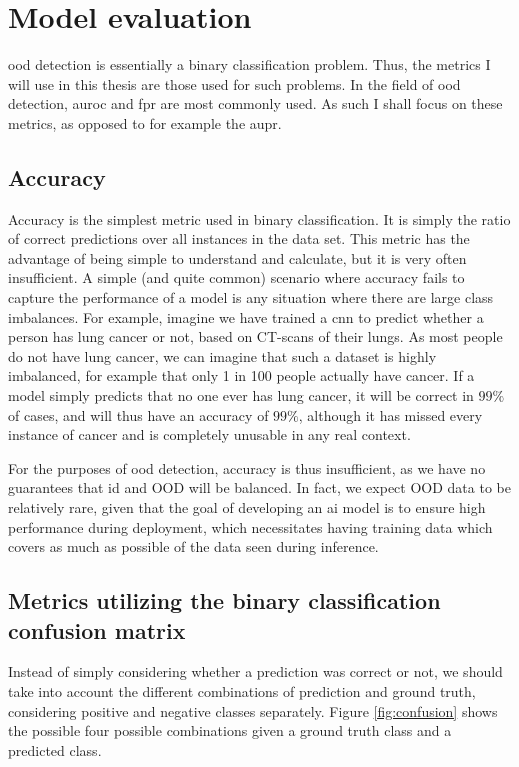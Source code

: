\documentclass[UKenglish]{uiomasterthesis} %
\theoremstyle{definition}
\begin{document}
\section{Model evaluation}

\ac{ood} detection is essentially a binary classification problem. Thus, the metrics I will use in this thesis are those used for such problems. In the field of \ac{ood} detection, \ac{auroc} and \ac{fpr} are most commonly used. As such I shall focus on these metrics, as opposed to for example the \ac{aupr}.

\subsection{Accuracy}

Accuracy is the simplest metric used in binary classification. It is simply the ratio of correct predictions over all instances in the data set. This metric has the advantage of being simple to understand and calculate, but it is very often insufficient. A simple (and quite common) scenario where accuracy fails to capture the performance of a model is any situation where there are large class imbalances. For example, imagine we have trained a \ac{cnn} to predict whether a person has lung cancer or not, based on CT-scans of their lungs. As most people do not have lung cancer, we can imagine that such a dataset is highly imbalanced, for example that only 1 in 100 people actually have cancer. If a model simply predicts that no one ever has lung cancer, it will be correct in $99\%$ of cases, and will thus have an accuracy of $99\%$, although it has missed every instance of cancer and is completely unusable in any real context.

For the purposes of \ac{ood} detection, accuracy is thus insufficient, as we have no guarantees that \ac{id} and OOD will be balanced. In fact, we expect OOD data to be relatively rare, given that the goal of developing an \ac{ai} model is to ensure high performance during deployment, which necessitates having training data which covers as much as possible of the data seen during inference.

\subsection{Metrics utilizing the binary classification confusion matrix} \label{section:aurocfpr95}

Instead of simply considering whether a prediction was correct or not, we should take into account the different combinations of prediction and ground truth, considering positive and negative classes separately. Figure \ref{fig:confusion} shows the possible four possible combinations given a ground truth class and a predicted class.
\end{document}
